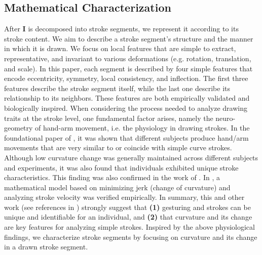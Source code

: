 
\vspace{-4mm}
\subsection{Mathematical Characterization} \label{subsec: featureExtraction}
\vspace{-1mm}
After $\mathbf{I}$ is decomposed into stroke segments, we represent it according to its stroke content. We aim to describe a stroke segment's structure and the manner in which it is drawn. We focus on local features that are simple to extract, representative, and invariant to various deformations (e.g. rotation, translation, and scale). In this paper, each segment is described by four simple features that encode eccentricity, symmetry, local consistency, and inflection. The first three features describe the stroke segment itself, while the last one describe its relationship to its neighbors. These features are both empirically validated and biologically inspired. When considering the process needed to analyze drawing traits at the stroke level, one fundamental factor arises, namely the neuro-geometry of hand-arm movement, i.e. the physiology in drawing strokes. In the foundational paper of  \cite{morasso1981spatial}, it was shown that different subjects produce hand/arm movements that are very similar to or coincide with simple curve strokes. Although low curvature change was generally maintained across different subjects and experiments, it was also found that individuals exhibited unique stroke characteristics. This finding was also confirmed in the work of  \cite{abend1982human}. In \cite{flash1985coordination}, a mathematical model based on minimizing jerk (change of curvature) and analyzing stroke velocity was verified empirically. In summary, this and other work (see references in \cite{flash1985coordination}) strongly suggest that \textbf{(1)} gesturing and strokes can be unique and identifiable for an individual, and \textbf{(2)} that curvature and its change are key features for analyzing simple strokes. Inspired by the above physiological findings, we characterize stroke segments by focusing on curvature and its change in a drawn stroke segment.

